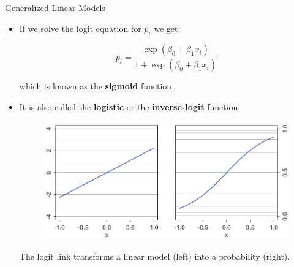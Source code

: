\documentclass[handout]{beamer}
\begin{document}
\begin{frame}{Generalized Linear Models}
\scriptsize{
\begin{itemize}

\item If we solve the logit equation for $p_i$ we get:

\begin{equation}
 p_i = \frac{\exp (\beta_0 + \beta_1 x_i)}{1+\exp (\beta_0 + \beta_1 x_i)}
\end{equation}

which is known as the \textbf{sigmoid} function.

\item It is also called the \textbf{logistic} or the \textbf{inverse-logit} function.

\begin{figure}[h!]
	\centering
	\includegraphics[scale=0.4]{pics/sigmoid.png}
\end{figure}

The logit link transforms a linear model (left) into a probability
(right).

\end{itemize}


}

\end{frame}
\end{document}
